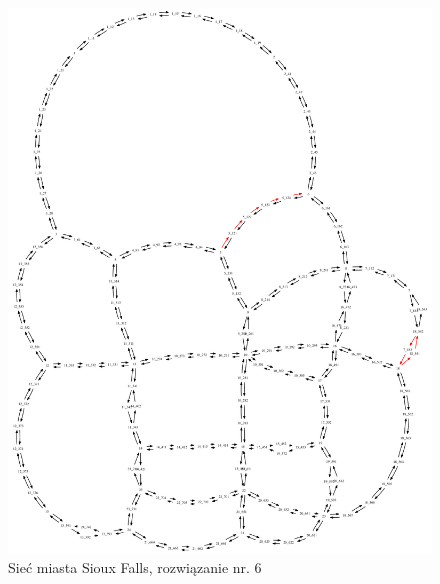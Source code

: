 \documentclass[twoside,12pt]{report}
\begin{document}
\begin{figure}[ht]
\centering
\includegraphics[totalheight=0.580\textheight, angle=90]{img/sioux-out/6/network2}
\caption{Sieć miasta Sioux Falls, rozwiązanie nr. 6}
\label{sioux6}
\end{figure}
\end{document}
